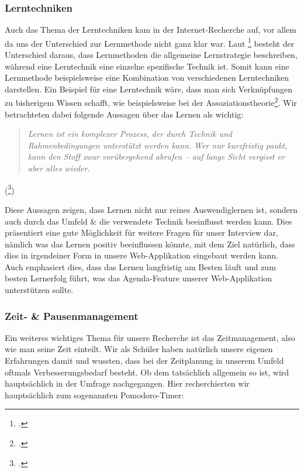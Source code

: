 \documentclass[12pt,a4paper]{report}
\begin{document}
\subsubsection{Lerntechniken}
Auch das Thema der Lerntechniken kam in der Internet-Recherche auf, vor allem da uns der Unterschied zur Lernmethode nicht ganz klar war. 
Laut \footcite{Lerntechnik_1} besteht der Unterschied daraus, dass Lernmethoden die allgemeine Lernstrategie beschreiben, während eine Lerntechnik eine einzelne spezifische Technik ist.
Somit kann eine Lernmethode beispielsweise eine Kombination von verschiedenen Lerntechniken darstellen. 
Ein Beispiel für eine Lerntechnik wäre, dass man sich Verknüpfungen zu bisherigem Wissen schafft, wie beispielsweise bei der Assoziationstheorie\footcite{Book2}.
Wir betrachteten dabei folgende Aussagen über das Lernen als wichtig: \begin{quote}
    \textit{Lernen ist ein komplexer Prozess, der durch Technik und Rahmenbedingungen unterstützt werden kann.\newline
Wer nur kurzfristig paukt, kann den Stoff zwar vorübergehend abrufen – auf lange Sicht vergisst er aber alles wieder.}
\end{quote}
(\footcite{Lerntechnik_2})\newline

Diese Aussagen zeigen, dass Lernen nicht nur reines Auswendiglernen ist, sondern auch durch das Umfeld \& die verwendete Technik beeinflusst werden kann.
Dies präsentiert eine gute Möglichkeit für weitere Fragen für unser Interview dar, nämlich was das Lernen positiv beeinflussen könnte, mit dem Ziel natürlich, dass dies in irgendeiner Form in unsere Web-Applikation eingebaut werden kann.
Auch emphasiert dies, dass das Lernen langfristig am Besten läuft und zum besten Lernerfolg führt, was das Agenda-Feature unserer Web-Applikation unterstützen sollte.

\subsubsection{Zeit- \& Pausenmanagement}
Ein weiteres wichtiges Thema für unsere Recherche ist das Zeitmanagement, also wie man seine Zeit einteilt. 
Wir als Schüler haben natürlich unsere eigenen Erfahrungen damit und wussten, dass bei der Zeitplanung in unserem Umfeld oftmals Verbesserungsbedarf besteht. 
Ob dem tatsächlich allgemein so ist, wird hauptsächlich in der Umfrage nachgegangen. Hier recherchierten wir hauptsächlich zum sogenannten Pomodoro-Timer:
\end{document}

